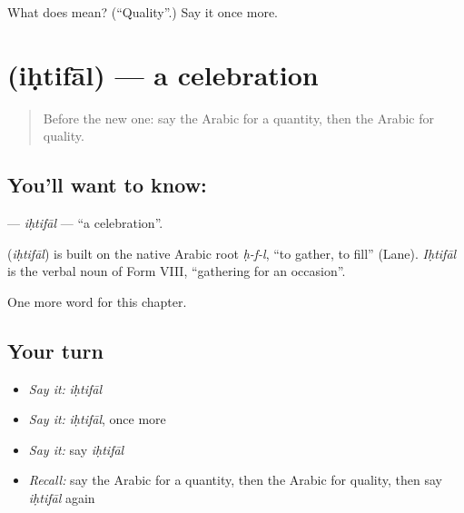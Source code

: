 \begin{tcolorbox}[breakable,colback=teal!4,colframe=teal!35!black,title={Before you move on}]
What does  mean? (\textquotedblleft{}Quality\textquotedblright{}.) Say it once more.
\end{tcolorbox}
\section[\texorpdfstring{\ar{احتفال} (iḥtifāl)}{احتفال (iḥtifāl)}]{ (iḥtifāl) — a celebration}

\label{lesson:AR-C249-ihtifal}



\begin{quote}
Before the new one: say the Arabic for a quantity, then the Arabic for quality.
\end{quote}

\subsection*{You'll want to know: }
\textbf{} — \emph{iḥtifāl} — \textquotedblleft{}a celebration\textquotedblright{}.

\begin{cousinweb}
\textbf{} (\emph{iḥtifāl}) is built on the native Arabic root \emph{ḥ-f-l}, \textquotedblleft{}to gather, to fill\textquotedblright{} (Lane). \emph{Iḥtifāl} is the verbal noun of Form VIII, \textquotedblleft{}gathering for an occasion\textquotedblright{}.
\end{cousinweb}

\begin{grammarlens}[title={What you've built}]
One more word for this chapter.
\end{grammarlens}

\subsection*{Your turn}
\begin{itemize}
\raggedright
  \item \emph{Say it:} \emph{iḥtifāl}
  \item \emph{Say it:} \emph{iḥtifāl}, once more
  \item \emph{Say it:} say \emph{iḥtifāl}
  \item \emph{Recall:} say the Arabic for a quantity, then the Arabic for quality, then say \emph{iḥtifāl} again
\end{itemize}

